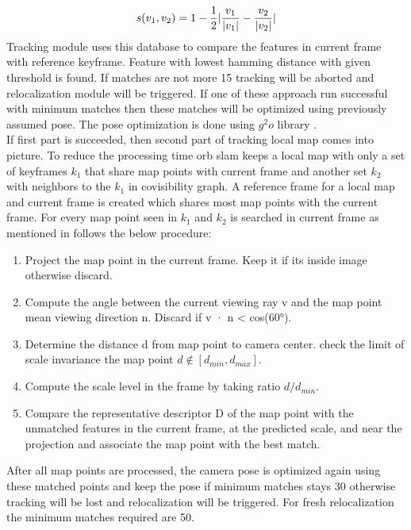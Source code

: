\begin{equation*}
s(v_{1},v_{2}) = 1 - \frac{1}{2} \arrowvert \frac{v_{1}}{|v_{1}|} - \frac{v_{2}}{|v_{2}|} \arrowvert 
\label{norm}
\end{equation*}  
\linebreak 
Tracking module uses this database to compare the features in current frame with reference keyframe. Feature with lowest hamming distance with given threshold is found. If matches are not more 15 tracking will be aborted and relocalization module will be triggered. If one of these approach run successful with minimum matches then these matches will be optimized using previously assumed pose. The pose optimization is done using $ g^{2}o $ library \cite{g2o}. \\
\linebreak
If first part is succeeded, then second part of tracking local map comes into picture. To reduce the processing time \acrshort{orb} \acrshort{slam} keeps a local map with only a set of keyframes $ k_{1} $ that share map points with current frame and another set $k_{2} $ with neighbors to the $ k_{1} $ in covisibility graph. A reference frame for a local map and current frame is created which shares most map points with the current frame. For every map point seen in $ k_{1} $ and $ k_{2} $ is searched in current frame as mentioned in \cite{orbslam} follows the below procedure: 
\begin{enumerate}
	\item Project the map point in the current frame. Keep it if its inside image otherwise discard.
	\item Compute the angle between the current viewing ray v and the map point mean viewing
	direction n. Discard if v · n < cos(60°).
	\item Determine the distance d from map point to camera center. check the limit of scale invariance the map point $ d \notin [d_ {min} , d_{max}] $. 
	\item Compute the scale level in the frame by taking ratio $ d/d_{min} $.
	\item Compare the representative descriptor D of the map point with the unmatched features in the current frame, at the predicted scale, and near the projection and associate the map point with the best match.
\end{enumerate}
After all map points are processed, the camera pose is optimized again using these matched points and keep the pose if minimum matches stays 30 otherwise tracking will be lost and relocalization will be triggered. For fresh relocalization the minimum matches required are 50. \\
